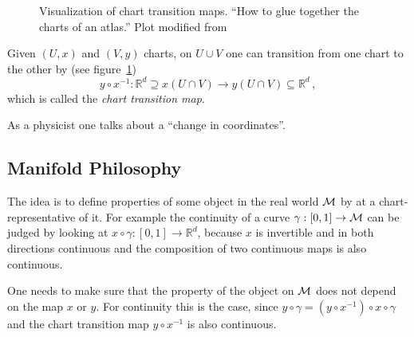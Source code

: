\documentclass[11pt, a4paper, twocolumn]{article} %
\begin{document}
\begin{figure}[tbh]

    \caption{Visualization of chart transition maps. ``How to glue together the charts of an atlas.'' Plot modified from~\citep{texstackexchange:manifolds}}
    \label{fig:transitionmaps}
\end{figure}
Given $(U, x)$ and $(V, y)$ charts, on $U\cup V$ one can transition from
one chart to the other by (see figure~\ref{fig:transitionmaps})
\begin{equation}
    y\circ x^{-1}: \mathbb{R}^{d} \supseteq x(U\cap V) \to y(U\cap V) \subseteq \mathbb{R}^{d}\,,
\end{equation}
which is called the \textit{chart transition map}.
\begin{note}
    As a physicist one talks about a ``change in coordinates''.
\end{note}

\subsection{Manifold Philosophy}

The idea is to define properties of some object in the real world $\mathcal{M}$ by at a chart-representative
of it. For example the continuity of a curve $\gamma: [0,1]\to\mathcal{M}$ can be judged by looking at
$x\circ\gamma: [0,1]\to\mathbb{R}^{d}$, because $x$ is invertible and in both directions continuous
and the composition of two continuous maps is also continuous.
\begin{note}
    One needs to make sure that the property of the object on $\mathcal{M}$ does not depend on the
    map $x$ or $y$. For continuity this is the case, since 
    $y\circ\gamma = (y\circ x^{-1}) \circ x\circ \gamma$ and the chart transition map
    $y\circ x^{-1}$ is also continuous.
\end{note}
\end{document}
